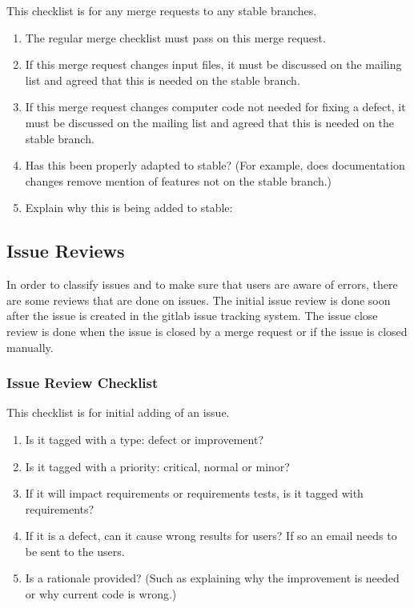\documentclass{article}
\begin{document}
This checklist is for any merge requests to any stable branches.

\begin{enumerate}
\item  The regular merge checklist must pass on this merge request.
\item  If this merge request changes input files, it must be discussed on the mailing list and agreed that this is needed on the stable branch.
\item  If this merge request changes computer code not needed for fixing a defect, it must be discussed on the mailing list and agreed that this is needed on the stable branch.
\item  Has this been properly adapted to stable? (For example, does documentation changes remove mention of features not on the stable branch.)
\item  Explain why this is being added to stable:
\end{enumerate}

\subsection{Issue Reviews}

In order to classify issues and to make sure that users are aware of
errors, there are some reviews that are done on issues.  The initial
issue review is done soon after the issue is created in the gitlab
issue tracking system.  The issue close review is done when the issue
is closed by a merge request or if the issue is closed manually.

\subsubsection{Issue Review Checklist}

This checklist is for initial adding of an issue.

\begin{enumerate}
\item  Is it tagged with a type: defect or improvement?
\item  Is it tagged with a priority: critical, normal or minor?
\item  If it will impact requirements or requirements tests, is it tagged with requirements?
\item  If it is a defect, can it cause wrong results for users? If so an email needs to be sent to the users.
\item  Is a rationale provided? (Such as explaining why the improvement is needed or why current code is wrong.)
\end{enumerate}
\end{document}
